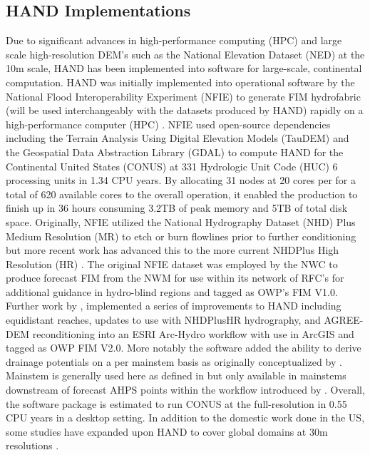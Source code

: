\subsection{HAND Implementations}
%
Due to significant advances in high-performance computing (HPC) and large scale high-resolution DEM's such as the National Elevation Dataset (NED) at the 10m scale, HAND has been implemented into software for large-scale, continental computation. 
HAND was initially implemented into operational software by the National Flood Interoperability Experiment (NFIE) to generate FIM hydrofabric (will be used interchangeably with the datasets produced by HAND) rapidly on a high-performance computer (HPC) \cite{maidment2017conceptual,liu2016cybergis}. 
NFIE used open-source dependencies including the Terrain Analysis Using Digital Elevation Models (TauDEM) \cite{tarboton2005terrain} and the Geospatial Data Abstraction Library (GDAL) \cite{warmerdam2008geospatial} to compute HAND for the Continental United States (CONUS) at 331 Hydrologic Unit Code (HUC) 6 processing units in 1.34 CPU years.
By allocating 31 nodes at 20 cores per for a total of 620 available cores to the overall operation, it enabled the production to finish up in 36 hours consuming 3.2TB of peak memory and 5TB of total disk space.
Originally, NFIE utilized the National Hydrography Dataset (NHD) Plus Medium Resolution (MR) to etch or burn flowlines prior to further conditioning but more recent work has advanced this to the more current NHDPlus High Resolution (HR) \cite{liu2020height}. 
The original NFIE dataset was employed by the NWC to produce forecast FIM from the NWM for use within its network of RFC's for additional guidance in hydro-blind regions and tagged as OWP's FIM V1.0.
Further work by , implemented a series of improvements to HAND including equidistant reaches, updates to use with NHDPlusHR hydrography, and AGREE-DEM reconditioning \cite{hellweger1997agree} into an ESRI Arc-Hydro workflow with use in ArcGIS and tagged as OWP FIM V2.0. 
More notably the software added the ability to derive drainage potentials on a per mainstem basis as originally conceptualized by .
Mainstem is generally used here as defined in  but only available in mainstems downstream of forecast AHPS points within the workflow introduced by .
Overall, the software package is estimated to run CONUS at the full-resolution in 0.55 CPU years in a desktop setting.
In addition to the domestic work done in the US, some studies have expanded upon HAND to cover global domains at 30m resolutions \cite{yamazaki2019merit,donchyts2016global}.
%
